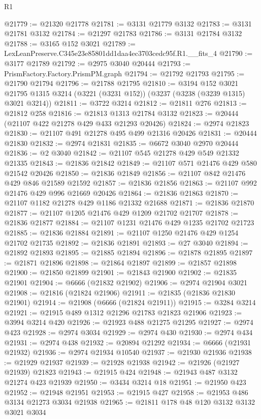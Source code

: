\begin{lexlean}{R1}
\begin{coremodule}
@21779 := @21320 @21778
@21781 := @3131 @21779 @3132
@21783 := @3131 @21781 @3132
@21784 := @21297 @21783
@21786 := @3131 @21784 @3132
@21788 := @3165 @152 @3021
@21789 := LexLeanPreserve.C345e23e85801dd1daa4ec3703cedc95f.R1.__fits_4
@21790 := @3177 @21789
@21792 := @2975 @3040 @20444
@21793 := PrismFactory.Factory.PrismPM.graph
@21794 := @21792 @21793
@21795 := @21790 @21794
@21796 := @21788 @21795
@21810 := @3194
    @152
    @3021
    @21795
    @1315
    @3214
    (@3221 (@3231 @152))
    (@3237 (@3238 (@3239 @1315) @3021 @3214))
@21811 := @3722 @3214
@21812 := @21811 @276
@21813 := @21812 @258
@21816 := @21813 @1313 @21784 @3132
@21823 := @20444 (@21107 @422 @21278 @429 @433 @21293 @20426)
@21824 := @2974 @21823
@21830 := @21107 @491 @21278 @495 @499 @21316 @20426
@21831 := @20444 @21830
@21832 := @2974 @21831
@21835 := @6672 @3040 @2970 @20444
@21836 := @2 @3040
@21842 := @21107 @545 @21278 @429 @549 @21332 @21335
@21843 := @21836 @21842
@21849 := @21107 @571 @21476 @429 @580 @21542 @20426
@21850 := @21836 @21849
@21856 := @21107 @842 @21476 @429 @846 @21589 @21592
@21857 := @21836 @21856
@21863 := @21107 @992 @21476 @429 @996 @21669 @20426
@21864 := @21836 @21863
@21870 := @21107 @1182 @21278 @429 @1186 @21332 @21688
@21871 := @21836 @21870
@21877 := @21107 @1205 @21476 @429 @1209 @21702 @21707
@21878 := @21836 @21877
@21884 := @21107 @1231 @21476 @429 @1235 @21702 @21723
@21885 := @21836 @21884
@21891 := @21107 @1250 @21476 @429 @1254 @21702 @21735
@21892 := @21836 @21891
@21893 := @27 @3040
@21894 := @21892 @21893
@21895 := @21885 @21894
@21896 := @21878 @21895
@21897 := @21871 @21896
@21898 := @21864 @21897
@21899 := @21857 @21898
@21900 := @21850 @21899
@21901 := @21843 @21900
@21902 := @21835 @21901
@21904 := @6666 (@21832 @21902)
@21906 := @2974 @21904 @3021
@21908 := @21816 (@21824 @21906)
@21911 := @21835 (@21836 @21830 @21901)
@21914 := @21908 (@6666 (@21824 @21911))
@21915 := @3284 @3214
@21921 := @21915 @489 @1312 @21296 @21783 @21823 @21906
@21923 := @3994 @3214 @420
@21926 := @21923 @488 @21275 @21295
@21927 := @2974 @423
@21928 := @2974 @3034
@21929 := @2974 @430
@21930 := @2974 @434
@21931 := @2974 @438
@21932 := @20894 @21292
@21934 := @6666 (@21931 @21932)
@21936 := @2974 @21934 @10540
@21937 := @21930 @21936
@21938 := @21929 @21937
@21939 := @21928 @21938
@21942 := @21926 (@21927 @21939) @21823
@21943 := @21915 @424
@21948 := @21943 @487 @3132 @21274 @423 @21939
@21950 := @3434 @3214 @18
@21951 := @21950 @423
@21952 := @21948 @21951
@21953 := @21915 @427
@21958 := @21953 @486 @3134 @21273 @3034 @21938
@21965 := @21811 @178 @48 @120 @3132 @3132 @3021 @3034

\end{coremodule}
\end{lexlean}
